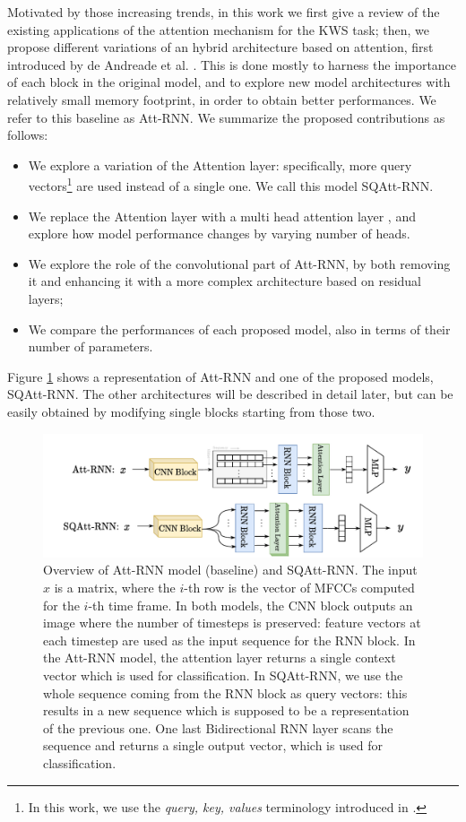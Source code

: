 Motivated by those increasing trends, in this work we first give a review of the existing applications of the attention mechanism for the KWS task; then, we propose different variations of an hybrid architecture based on attention, first introduced by de Andreade et al. \cite{attention2018andreade}. This is done mostly to harness the importance of each block in the original model, and to explore new model architectures with relatively small memory footprint, in order to obtain better performances. We refer to this baseline as Att-RNN. We summarize the proposed contributions as follows:
\begin{itemize}
	\item We explore a variation of the Attention layer: specifically, more query vectors\footnote{In this work, we use the \textit{query, key, values} terminology introduced in \cite{attentionisall2017vaswani}.} are used instead of a single one. We call this model SQAtt-RNN. 
	\item We replace the Attention layer with a multi head attention layer \cite{attentionisall2017vaswani}, and explore how model performance changes by varying number of heads.
	\item We explore the role of the convolutional part of Att-RNN, by both removing it and enhancing it with a more complex architecture based on residual layers;
	\item We compare the performances of each proposed model, also in terms of their number of parameters.
	
\end{itemize}
Figure \ref{fig:models_overview} shows a representation of Att-RNN and one of the proposed models, SQAtt-RNN. The other architectures will be described in detail later, but can be easily obtained by modifying single blocks starting from those two.

\begin{figure}
	\centering
	\includegraphics[width=0.9\linewidth]{imgs/models_overview.pdf}
	\caption{Overview of Att-RNN model (baseline) and SQAtt-RNN. The input $x$ is a matrix, where the $i$-th row is the vector of MFCCs computed for the $i$-th time frame. In both models, the CNN block outputs an image where the number of timesteps is preserved: feature vectors at each timestep are used as the input sequence for the RNN block. In the Att-RNN model, the attention layer returns a single context vector which is used for classification. In SQAtt-RNN, we use the whole sequence coming from the RNN block as query vectors: this results in a new sequence which is supposed to be a representation of the previous one. One last Bidirectional RNN layer scans the sequence and returns a single output vector, which is used for classification.}
	\label{fig:models_overview}
\end{figure}


